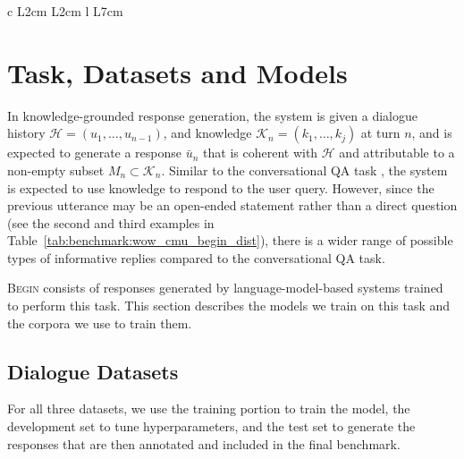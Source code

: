 \begin{table*}[ht]
\begin{tabular}{c L{2cm} L{2cm} l L{7cm}}
     
        \bottomrule
    \end{tabular}
    \caption{\small Examples of each of the three categories of responses included in \begindata{}. For each category, we provide an example drawn from one of the four models trained on one of the three corpora (of course, all 12 models generated all three types of responses). The dialogue corpus used to train the model and generate the response is listed vertically. Text highlighted in green indicates information that is attributable to the knowledge; text in blue does not convey any information; and text in red is hallucinated and cannot be attributed to the knowledge.}
    \label{tab:benchmark:wow_cmu_begin_dist}
\end{table*}

\section{Task, Datasets and Models}
\label{sec:setup}

In {knowledge-grounded response generation}, the system is given a dialogue history
$\mathcal{H}=(u_1, \dots, u_{n-1})$, and knowledge $\mathcal{K}_n = (k_1, \dots, k_{j})$ at turn $n$, and is expected to generate a response $\bar{u}_{n}$ that is coherent with $\mathcal{H}$ and attributable to a non-empty subset $M_n \subset \mathcal{K}_n$.  Similar to the conversational QA task \cite{choi-etal-2018-quac, reddy-etal-2019-coqa}, the system is expected to use knowledge to respond to the user query. However, since the previous utterance may be an open-ended statement rather than a direct question (see the second and third examples in Table~\ref{tab:benchmark:wow_cmu_begin_dist}), there is a wider range of possible types of informative replies compared to the conversational QA task.

\textsc{Begin} consists of responses generated by language-model-based systems trained to perform this task. This section describes the models we train on this task and the corpora we use to train them.

\subsection{Dialogue Datasets}

For all three datasets, we use the training portion to train the model, the development set to tune hyperparameters, and the test set to generate the responses that are then annotated and included in the final \begindata{} benchmark.

